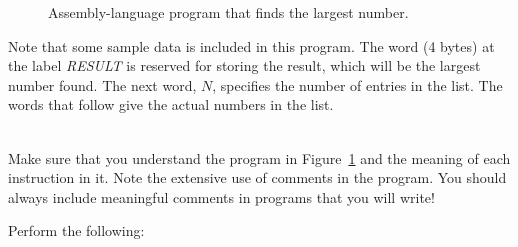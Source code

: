 \documentclass[epsfig,10pt,fullpage]{article}
\begin{document}
\begin{figure}[H]
\begin{center}
\begin{minipage}[t]{16.5 cm}

\end{minipage}
\end{center}
\caption{Assembly-language program that finds the largest number.}
\label{fig:code}
\end{figure}

Note that some sample data is included in this program.
The word (4 bytes) at the label {\it RESULT} is reserved for storing the result, which will be 
the largest number found. The next word, $N$, specifies the number of entries in the list.
The words that follow give the actual numbers in the list.

~\\
Make sure that you understand the program in Figure~\ref{fig:code} and the meaning of each 
instruction in it. Note the extensive use of comments in the program.
You should always include meaningful comments in programs that you will write!

Perform the following:
\end{document}
